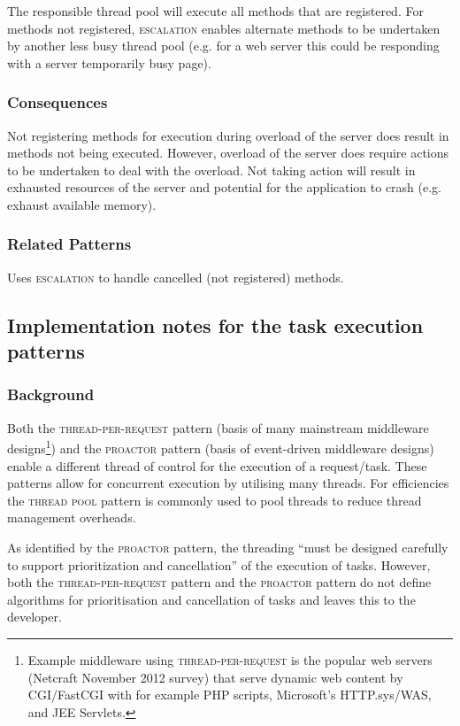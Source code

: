 \documentclass[prodmode]{style/acmlarge}
\begin{document}
The responsible thread pool will execute all methods that are registered.  For
methods not registered, \textsc{escalation} enables alternate methods to be
undertaken by another less busy thread pool (e.g. for a web server this could be
responding with a server temporarily busy page).

\subsubsection*{Consequences} Not registering methods for execution during
overload of the server does result in methods not being executed.  However,
overload of the server does require actions to be undertaken to deal with the
overload.  Not taking action will result in exhausted resources of the server
and potential for the application to crash (e.g. exhaust available memory).

\subsubsection*{Related Patterns} Uses \textsc{escalation} to handle cancelled
(not registered) methods.



\subsection{Implementation notes for the task execution patterns}

\subsubsection*{Background}

Both the \textsc{thread-per-request} pattern \cite{thread-per-request} (basis of
many mainstream middleware designs\footnote{Example middleware using
\textsc{thread-per-request} is the popular web servers (Netcraft November 2012
survey) that serve dynamic web content by CGI/FastCGI with for example PHP scripts,
Microsoft's HTTP.sys/WAS, and JEE Servlets.}) and the \textsc{proactor} pattern
\cite{proactor} (basis of event-driven middleware designs) enable a different
thread of control for the execution of a request/task.  These patterns allow for
concurrent execution by utilising many threads.  For efficiencies the
\textsc{thread pool} pattern \cite{thread-per-request} is commonly used to pool
threads to reduce thread management overheads.

As identified by the \textsc{proactor} pattern, the threading ``must be designed
carefully to support prioritization and cancellation'' \cite[p. 8]{proactor} of
the execution of tasks.  However, both the \textsc{thread-per-request} pattern and
the \textsc{proactor} pattern do not define algorithms for
prioritisation and cancellation of tasks and leaves this to the developer.
\end{document}
